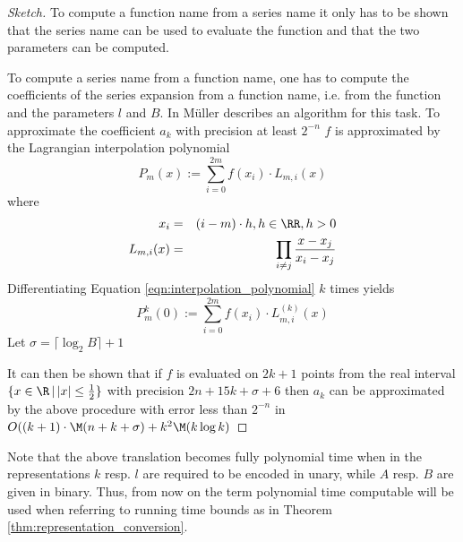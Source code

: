 	 \begin{proof}[Sketch]
	 	To compute a function name from a series name it only has to be shown that the series name can be used to evaluate the function and that the two parameters can be computed.
		


	 	To compute a series name from a function name, one has to compute the coefficients of the series expansion from a function name, i.e. from the function and the parameters $l$ and $B$.
	 	In \cite{Mue} M\"uller describes an algorithm for this task.
	 	To approximate the coefficient $a_k$ with precision at least $2^{-n}$ $f$ is approximated by the Lagrangian interpolation
	 	polynomial
	 	\begin{equation}\label{eqn:interpolation_polynomial}
	 		P_m(x)  :=  \sum_{i=0}^{2m} f(x_i) \cdot L_{m,i}(x) 
	 	\end{equation}
	 	where
	 	\begin{eqnarray*}
	 		x_i & = & (i-m) \cdot h , h \in \RR, h > 0 \\
	 		L_{m,i}(x) & = & \prod_{i \neq j} \frac{x-x_j}{x_i-x_j} 
	 	\end{eqnarray*}
	 	Differentiating Equation \ref{eqn:interpolation_polynomial} $k$ times yields
	 	\begin{equation}\label{eqn:interpolation_polynomial_diff}
	 		P_m^k(0)  :=  \sum_{i=0}^{2m} f(x_i) \cdot L_{m,i}^{(k)}(x) 
	 	\end{equation}
	 	Let $\sigma = \lceil \log_2 B \rceil + 1$

	 	It can then be shown that if $f$ is evaluated on $2k+1$ points from the 
	 	real interval $\{x \in \R \,|\, |x| \leq \frac{1}{2}\}$ with precision $2n+15k+\sigma+6$ 
	 	then $a_k$ can be approximated by the above procedure with error less than $2^{-n}$ in 
	 	$O((k+1)\cdot \M(n+k+\sigma) + k^2 \M (k \log k)$

	 \end{proof}
	 Note that the above translation becomes fully polynomial time when in the representations $k$ resp. $l$ are required to be encoded in unary, while $A$ resp. $B$ are given in binary.
	 Thus, from now on the term polynomial time computable will be used when referring to running time bounds as in Theorem \ref{thm:representation_conversion}.

